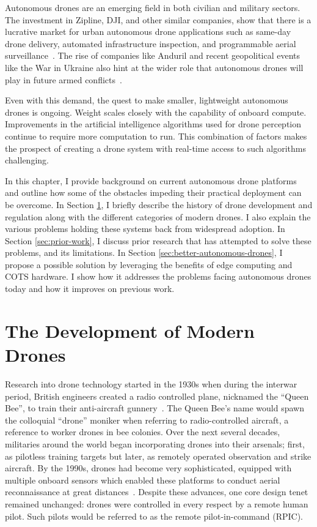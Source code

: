 Autonomous drones are an emerging field in both civilian and military sectors. The investment in Zipline, DJI, and other similar companies, show that there is a lucrative market for urban autonomous drone applications such as same-day drone delivery, automated infrastructure inspection, and programmable aerial surveillance~\cite{GrandviewResearchDroneMarket,ForbesZiplineEvaluation}. The rise of companies like Anduril and recent geopolitical events like the War in Ukraine also hint at the wider role that autonomous drones will play in future armed conflicts~\cite{CNBC,CFAS}.

Even with this demand, the quest to make smaller, lightweight autonomous drones is ongoing. Weight scales closely with the capability of onboard compute. Improvements in the artificial intelligence algorithms used for drone perception continue to require more computation to run. This combination of factors makes the prospect of creating a drone system with real-time access to such algorithms challenging.

In this chapter, I provide background on current autonomous drone platforms and outline how some of the obstacles impeding their practical deployment can be overcome. In Section \ref{sec:history-drone-development}, I briefly describe the history of drone development and regulation along with the different categories of modern drones. I also explain the various problems holding these systems back from widespread adoption. In Section \ref{sec:prior-work}, I discuss prior research that has attempted to solve these problems, and its limitations. In Section \ref{sec:better-autonomous-drones}, I propose a possible solution by leveraging the benefits of edge computing and COTS hardware. I show how it addresses the problems facing autonomous drones today and how it improves on previous work.

\section{The Development of Modern Drones}
\label{sec:history-drone-development}

Research into drone technology started in the 1930s when during the interwar period, British engineers created a radio controlled plane, nicknamed the ``Queen Bee'', to train their anti-aircraft gunnery~\cite{IWMDrone}. The Queen Bee's name would spawn the colloquial ``drone'' moniker when referring to radio-controlled aircraft, a reference to worker drones in bee colonies. Over the next several decades, militaries around the world began incorporating drones into their arsenals; first, as pilotless training targets but later, as remotely operated observation and strike aircraft. By the 1990s, drones had become very sophisticated, equipped with multiple onboard sensors which enabled these platforms to conduct aerial reconnaissance at great distances~\cite{GlobalHawk}. Despite these advances, one core design tenet remained unchanged: drones were controlled in every respect by a remote human pilot. Such pilots would be referred to as the remote pilot-in-command (RPIC).

